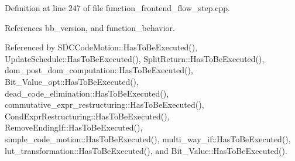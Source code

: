 Definition at line 247 of file function\+\_\+frontend\+\_\+flow\+\_\+step.\+cpp.



References bb\+\_\+version, and function\+\_\+behavior.



Referenced by S\+D\+C\+Code\+Motion\+::\+Has\+To\+Be\+Executed(), Update\+Schedule\+::\+Has\+To\+Be\+Executed(), Split\+Return\+::\+Has\+To\+Be\+Executed(), dom\+\_\+post\+\_\+dom\+\_\+computation\+::\+Has\+To\+Be\+Executed(), Bit\+\_\+\+Value\+\_\+opt\+::\+Has\+To\+Be\+Executed(), dead\+\_\+code\+\_\+elimination\+::\+Has\+To\+Be\+Executed(), commutative\+\_\+expr\+\_\+restructuring\+::\+Has\+To\+Be\+Executed(), Cond\+Expr\+Restructuring\+::\+Has\+To\+Be\+Executed(), Remove\+Ending\+If\+::\+Has\+To\+Be\+Executed(), simple\+\_\+code\+\_\+motion\+::\+Has\+To\+Be\+Executed(), multi\+\_\+way\+\_\+if\+::\+Has\+To\+Be\+Executed(), lut\+\_\+transformation\+::\+Has\+To\+Be\+Executed(), and Bit\+\_\+\+Value\+::\+Has\+To\+Be\+Executed().

